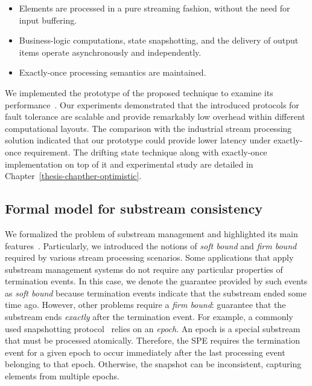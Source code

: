 \begin{itemize}
    \item Elements are processed in a pure streaming fashion, without the need for input buffering.
    \item Business-logic computations, state snapshotting, and the delivery of output items operate asynchronously and independently.
    \item Exactly-once processing semantics are maintained.
\end{itemize}

We implemented the prototype of the proposed technique to examine its performance~\cite{we2018adbis, we2018seim, thepaper}. Our experiments demonstrated that the introduced protocols for fault tolerance are scalable and provide remarkably low overhead within different computational layouts. The comparison with the industrial stream processing solution indicated that our prototype could provide lower latency under exactly-once requirement. The drifting state technique along with exactly-once implementation on top of it and experimental study are detailed in Chapter~\ref{thesis-chapther-optimistic}.

\subsection{Formal model for substream consistency}

We formalized the problem of substream management and highlighted its main features~\cite{10.1145/3524860.3539809, trofimov2023bounding}. Particularly, we introduced the notions of {\em soft bound} and {\em firm bound} required by various stream processing scenarios. Some applications that apply substream management systems do not require any particular properties of termination events. In this case, we denote the guarantee provided by such events as {\em soft bound} because termination events indicate that the substream ended some time ago. However, other problems require a {\em firm bound}: guarantee that the substream ends {\em exactly} after the termination event. For example, a commonly used snapshotting protocol~\cite{2015arXiv150608603C, jacques2016consistent} relies on an {\em epoch}. An epoch is a special substream that must be processed atomically. Therefore, the SPE requires the termination event for a given epoch to occur immediately after the last processing event belonging to that epoch. Otherwise, the snapshot can be inconsistent, capturing elements from multiple epochs.

